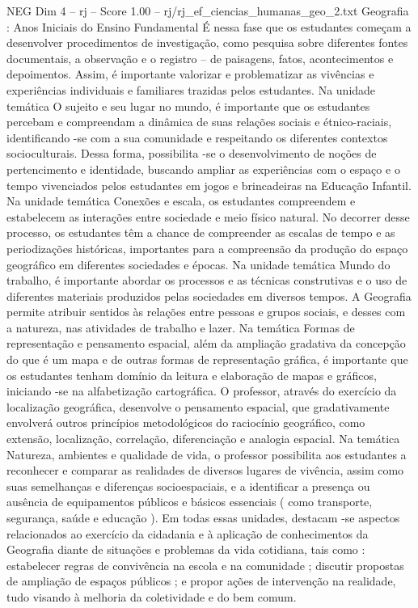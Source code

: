 \begin{textsample}{NEG Dim 4 – rj – Score 1.00 – rj/rj\_ef\_ciencias\_humanas\_geo\_2.txt}  \label{ex:f4_neg_126}
Geografia : Anos Iniciais do Ensino Fundamental É nessa fase que os estudantes começam a desenvolver procedimentos de investigação, como pesquisa sobre diferentes fontes documentais, a observação e o registro – de paisagens, fatos, acontecimentos e depoimentos.
Assim, é importante valorizar e problematizar as vivências e experiências individuais e familiares trazidas pelos estudantes.
Na unidade temática O sujeito e seu lugar no mundo, é importante que os estudantes percebam e compreendam a dinâmica de suas relações sociais e étnico-raciais, identificando -se com a sua comunidade e respeitando os diferentes contextos socioculturais.
Dessa forma, possibilita -se o desenvolvimento de noções de pertencimento e identidade, buscando ampliar as experiências com o espaço e o tempo vivenciados pelos estudantes em jogos e brincadeiras na Educação Infantil.
Na unidade temática Conexões e escala, os estudantes compreendem e estabelecem as interações entre sociedade e meio físico natural.
No decorrer desse processo, os estudantes têm a chance de compreender as escalas de tempo e as periodizações históricas, importantes para a compreensão da produção do espaço geográfico em diferentes sociedades e épocas.
Na unidade temática Mundo do trabalho, é importante abordar os processos e as técnicas construtivas e o uso de diferentes materiais produzidos pelas sociedades em diversos tempos.
A Geografia permite atribuir sentidos às relações entre pessoas e grupos sociais, e desses com a natureza, nas atividades de trabalho e lazer.
Na temática Formas de representação e pensamento espacial, além da ampliação gradativa da concepção do que é um mapa e de outras formas de representação gráfica, é importante que os estudantes tenham domínio da leitura e elaboração de mapas e gráficos, iniciando -se na alfabetização cartográfica.
O professor, através do exercício da localização geográfica, desenvolve o pensamento espacial, que gradativamente envolverá outros princípios metodológicos do raciocínio geográfico, como extensão, localização, correlação, diferenciação e analogia espacial.
Na temática Natureza, ambientes e qualidade de vida, o professor possibilita aos estudantes a reconhecer e comparar as realidades de diversos lugares de vivência, assim como suas semelhanças e diferenças socioespaciais, e a identificar a presença ou ausência de equipamentos públicos e básicos essenciais ( como transporte, segurança, saúde e educação ).
Em todas essas unidades, destacam -se aspectos relacionados ao exercício da cidadania e à aplicação de conhecimentos da Geografia diante de situações e problemas da vida cotidiana, tais como : estabelecer regras de convivência na escola e na comunidade ; discutir propostas de ampliação de espaços públicos ; e propor ações de intervenção na realidade, tudo visando à melhoria da coletividade e do bem comum.

\end{textsample}
